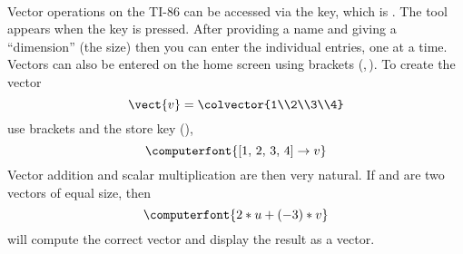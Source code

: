 \contributedby{\robertbeezer}\\
Vector operations on the TI-86 can be accessed via the  key, which is .  The  tool appears when the  key is pressed.  After providing a name and giving a ``dimension'' (the size) then you can enter the individual entries, one at a time.  Vectors can also be entered on the home screen using brackets (\computerfont{[},\,\computerfont{]}).  To create the vector
%
\begin{equation*}
\vect{v}=\colvector{1\\2\\3\\4}
\end{equation*}
%
use brackets and the store key (),
%
\begin{equation*}
\computerfont{[1,\,2,\,3,\,4]\rightarrow v}
\end{equation*}
%
Vector addition and scalar multiplication are then very natural.  If  and  are two vectors of equal size, then
%
\begin{equation*}
\computerfont{2*u + (-3)*v}
\end{equation*}
%
will compute the correct vector and display the result as a vector. 